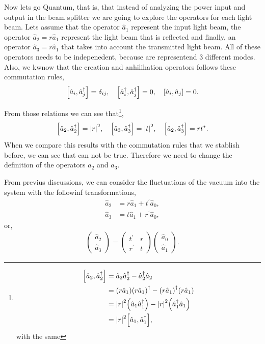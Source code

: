 \documentclass[a4paper]{tufte-handout} %
\newcommand{\hata}{\hat{a}}
\newcommand{\hatad}{\hat{a}^\dagger}
\begin{document}
Now lets go Quantum, that is, that instead of analyzing the power input and output in the beam splitter we are going to explore the operators for each light beam.
Lets assume that the operator $\hata_1$ represent the input light beam, the operator $\hata_2=r\hata_1$ represent the light beam that is reflected and finally, an operator $\hata_3=r\hata_1$ that takes into account the transmitted light beam.
All of these operators needs to be indepenedent, because are representend 3 different modes.
Also, we kwnow that the creation and anhilihation operators follows these commutation rules,
\begin{gather*}
    \commutator{\hata_i}{\hatad_j}=\delta_{ij},\quad
    \commutator{\hatad_i}{\hatad_j}=0,\quad
    \commutator{\hata_i}{\hata_j}=0.
\end{gather*}

From those relations we can see that\footnote{
\begin{align*}
    \commutator{\hata_2}{\hatad_2} &= \hata_2\hatad_2 - \hatad_2\hata_2 \\
                                   &= \qty(r\hata_1)\qty(r\hata_1)^\dagger - \qty(r\hata_1)^\dagger\qty(r\hata_1) \\
                                   &= \abs{r}^2\qty(\hata_1\hatad_1) - \abs{r}^2\qty(\hatad_1\hata_1) \\
                                    &= \abs{r}^2\commutator{\hata_1}{\hatad_1},
\end{align*}
with the same 
},
\begin{gather*}
    \commutator{\hata_2}{\hatad_2} = \abs{r}^2, \quad 
    \commutator{\hata_3}{\hatad_3} = \abs{t}^2, \quad 
    \commutator{\hata_2}{\hatad_3} = rt^*.
\end{gather*}
When we compare this results with the commutation rules that we stablish before, we can see that can not be true.
Therefore we need to change the definition of the operators $\hata_2$ and $\hata_3$.

From previus discussions, we can consider the fluctuations of the vacuum into the system with the followinf transformations,
\begin{align*}
    \hata_2 &= r\hata_1 + t^{'} \hata_0, \\
    \hata_3 &= t\hata_1 + r^{'} \hata_0,
\end{align*}
or,
\begin{gather*}
    \begin{pmatrix}
        \hata_2 \\ \hata_3
    \end{pmatrix}
    =
    \begin{pmatrix}
        t^' & r \\ r^' & t 
    \end{pmatrix}
    \begin{pmatrix}
        \hata_0 \\ \hata_1
    \end{pmatrix}.
\end{gather*}
\end{document}
